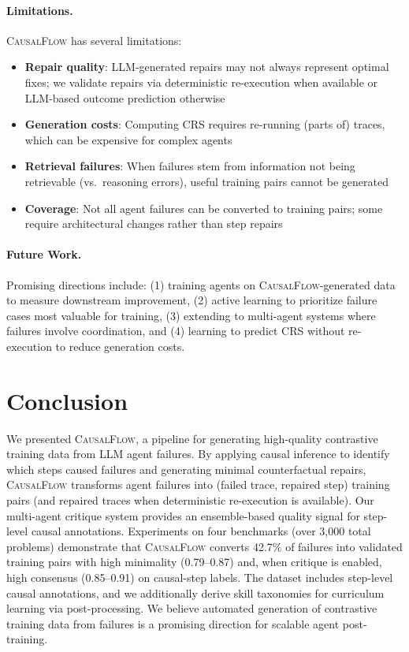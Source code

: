 \documentclass{article}
\theoremstyle{plain}
\theoremstyle{definition}
\theoremstyle{remark}
\begin{document}
\paragraph{Limitations.}
\textsc{CausalFlow} has several limitations:
\begin{itemize}
    \item \textbf{Repair quality}: LLM-generated repairs may not always represent optimal fixes; we validate repairs via deterministic re-execution when available or LLM-based outcome prediction otherwise
    \item \textbf{Generation costs}: Computing CRS requires re-running (parts of) traces, which can be expensive for complex agents
    \item \textbf{Retrieval failures}: When failures stem from information not being retrievable (vs.\ reasoning errors), useful training pairs cannot be generated
    \item \textbf{Coverage}: Not all agent failures can be converted to training pairs; some require architectural changes rather than step repairs
\end{itemize}

\paragraph{Future Work.}
Promising directions include: (1) training agents on \textsc{CausalFlow}-generated data to measure downstream improvement, (2) active learning to prioritize failure cases most valuable for training, (3) extending to multi-agent systems where failures involve coordination, and (4) learning to predict CRS without re-execution to reduce generation costs.


\section{Conclusion}

We presented \textsc{CausalFlow}, a pipeline for generating high-quality contrastive training data from LLM agent failures. By applying causal inference to identify which steps caused failures and generating minimal counterfactual repairs, \textsc{CausalFlow} transforms agent failures into (failed trace, repaired step) training pairs (and repaired traces when deterministic re-execution is available). Our multi-agent critique system provides an ensemble-based quality signal for step-level causal annotations. Experiments on four benchmarks (over 3{,}000 total problems) demonstrate that \textsc{CausalFlow} converts 42.7\% of failures into validated training pairs with high minimality (0.79--0.87) and, when critique is enabled, high consensus (0.85--0.91) on causal-step labels. The dataset includes step-level causal annotations, and we additionally derive skill taxonomies for curriculum learning via post-processing. We believe automated generation of contrastive training data from failures is a promising direction for scalable agent post-training.
\end{document}
